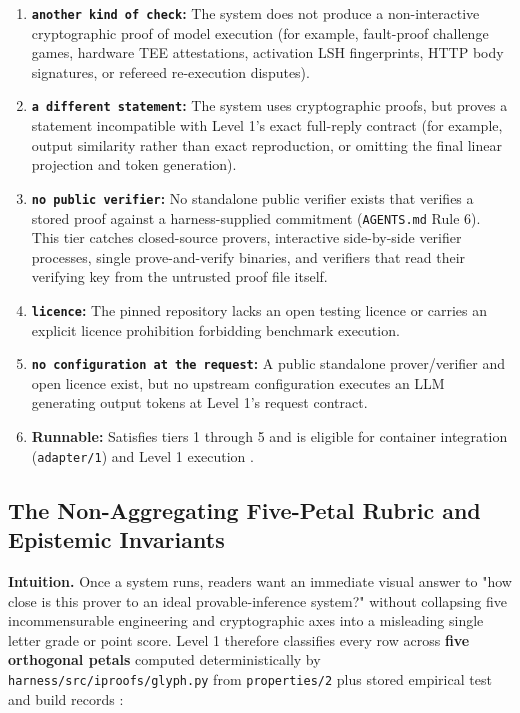 \documentclass[11pt,letterpaper]{article}
\begin{document}
\begin{enumerate}
\item \textbf{\texttt{another kind of check}:} The system does not produce a non-interactive cryptographic proof of model execution (for example, fault-proof challenge games, hardware TEE attestations, activation LSH fingerprints, HTTP body signatures, or refereed re-execution disputes).
\item \textbf{\texttt{a different statement}:} The system uses cryptographic proofs, but proves a statement incompatible with Level 1's exact full-reply contract (for example, output similarity rather than exact reproduction, or omitting the final linear projection and token generation).
\item \textbf{\texttt{no public verifier}:} No standalone public verifier exists that verifies a stored proof against a harness-supplied commitment (\texttt{AGENTS.\allowbreak{}md} Rule 6). This tier catches closed-source provers, interactive side-by-side verifier processes, single prove-and-verify binaries, and verifiers that read their verifying key from the untrusted proof file itself.
\item \textbf{\texttt{licence}:} The pinned repository lacks an open testing licence or carries an explicit licence prohibition forbidding benchmark execution.
\item \textbf{\texttt{no configuration at the request}:} A public standalone prover/verifier and open licence exist, but no upstream configuration executes an LLM generating output tokens at Level 1's request contract.
\item \textbf{Runnable:} Satisfies tiers 1 through 5 and is eligible for container integration (\texttt{adapter/\allowbreak{}1}) and Level 1 execution \cite{iproofs2026}.
\end{enumerate}

\subsection{The Non-Aggregating Five-Petal Rubric and Epistemic Invariants}

\textbf{Intuition.} Once a system runs, readers want an immediate visual answer to "how close is this prover to an ideal provable-inference system?" without collapsing five incommensurable engineering and cryptographic axes into a misleading single letter grade or point score. Level 1 therefore classifies every row across \textbf{five orthogonal petals} computed deterministically by \texttt{harness/\allowbreak{}src/\allowbreak{}iproofs/\allowbreak{}glyph.\allowbreak{}py} from \texttt{properties/\allowbreak{}2} plus stored empirical test and build records \cite{iproofs2026}:
\end{document}
